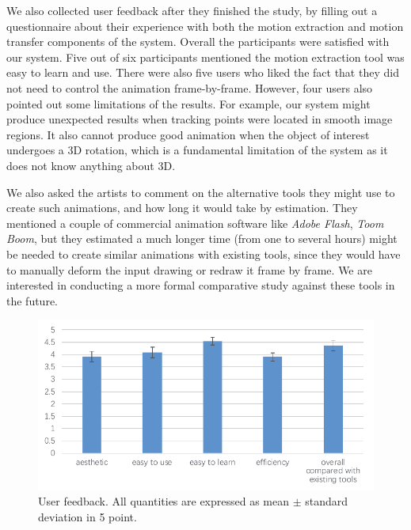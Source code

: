 We also collected user feedback after they finished the study, by filling out a questionnaire about their experience with both the motion extraction and motion transfer components of the system. Overall the participants were satisfied with our system. Five out of six participants mentioned the motion extraction tool was easy to learn and use. There were also five users who liked the fact that they did not need to control the animation frame-by-frame. However, four users also pointed out some limitations of the results. For example, our system might produce unexpected results when tracking points were located in smooth image regions. It also cannot produce good animation when the object of interest undergoes a 3D rotation, which is a fundamental limitation of the system as it does not know anything about 3D. 

We also asked the artists to comment on the alternative tools they might use to create such animations, and how long it would take by estimation. They mentioned a couple of commercial animation software like \emph{Adobe Flash}, \emph{Toom Boom}, but they estimated a much longer time (from one to several hours) might be needed to create similar animations with existing tools, since they would have to manually deform the input drawing or redraw it frame by frame. We are interested in conducting a more formal comparative study against these tools in the future.
 
\begin{figure}
	\centering
	\includegraphics[width=\linewidth]{images/feedback}
	\caption{User feedback. All quantities are expressed as mean $ \pm $ standard deviation in 5 point. }
	\label{fig:feedback}
\end{figure}
\fi

